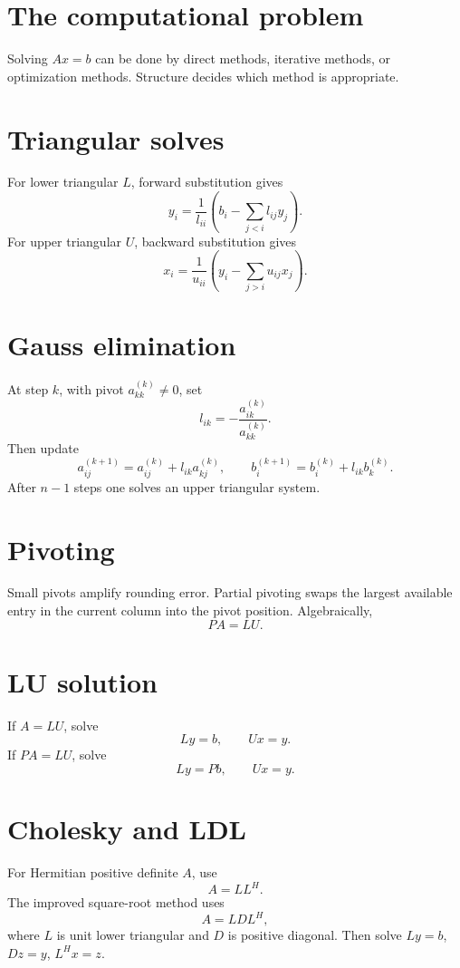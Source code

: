 
\section{The computational problem}
Solving \(Ax=b\) can be done by direct methods, iterative methods, or optimization methods.  Structure decides which method is appropriate.

\section{Triangular solves}
For lower triangular \(L\), forward substitution gives
\[
  y_i=\frac{1}{l_{ii}}\left(b_i-\sum_{j<i}l_{ij}y_j\right).
\]
For upper triangular \(U\), backward substitution gives
\[
  x_i=\frac{1}{u_{ii}}\left(y_i-\sum_{j>i}u_{ij}x_j\right).
\]

\section{Gauss elimination}
At step \(k\), with pivot \(a_{kk}^{(k)}\ne0\), set
\[
  l_{ik}=-\frac{a_{ik}^{(k)}}{a_{kk}^{(k)}}.
\]
Then update
\[
  a_{ij}^{(k+1)}=a_{ij}^{(k)}+l_{ik}a_{kj}^{(k)},\qquad
  b_i^{(k+1)}=b_i^{(k)}+l_{ik}b_k^{(k)}.
\]
After \(n-1\) steps one solves an upper triangular system.

\section{Pivoting}
Small pivots amplify rounding error.  Partial pivoting swaps the largest available entry in the current column into the pivot position.  Algebraically,
\[
  PA=LU.
\]

\section{LU solution}
If \(A=LU\), solve
\[
  Ly=b,\qquad Ux=y.
\]
If \(PA=LU\), solve
\[
  Ly=Pb,\qquad Ux=y.
\]

\section{Cholesky and LDL}
For Hermitian positive definite \(A\), use
\[
  A=LL^H.
\]
The improved square-root method uses
\[
  A=LDL^H,
\]
where \(L\) is unit lower triangular and \(D\) is positive diagonal.  Then solve \(Ly=b\), \(Dz=y\), \(L^Hx=z\).

